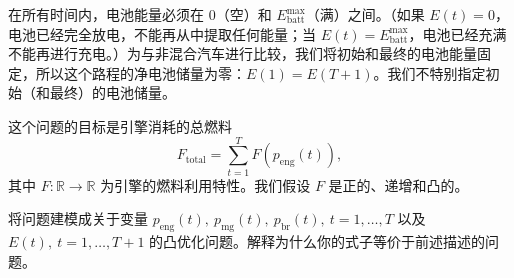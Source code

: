 \documentclass[UTF8, 12pt, fontset=fandol, oneside]{ctexart}
\begin{document}
在所有时间内，电池能量必须在 0（空）和 $E_{\mathrm{batt}}^{\max}$（满）之间。（如果 $E(t)=0$，电池已经完全放电，不能再从中提取任何能量；当 $E(t)=E_{\mathrm{batt}}^{\max}$，电池已经充满不能再进行充电。）为与非混合汽车进行比较，我们将初始和最终的电池能量固定，所以这个路程的净电池储量为零：$E(1)=E(T+1)$。我们不特别指定初始（和最终）的电池储量。

这个问题的目标是引擎消耗的总燃料
\[
F_{\mathrm{total}}=\sum_{t=1}^T F(p_{\mathrm{eng}}(t)),
\]
其中 $F:\mathbb{R}\to\mathbb{R}$ 为引擎的燃料利用特性。我们假设 $F$ 是正的、递增和凸的。

将问题建模成关于变量 $p_{\mathrm{eng}}(t),\ p_{\mathrm{mg}}(t),\ p_{\mathrm{br}}(t),\ t=1,\ldots,T$ 以及 $E(t),\ t=1,\ldots,T+1$ 的凸优化问题。解释为什么你的式子等价于前述描述的问题。
\end{document}
